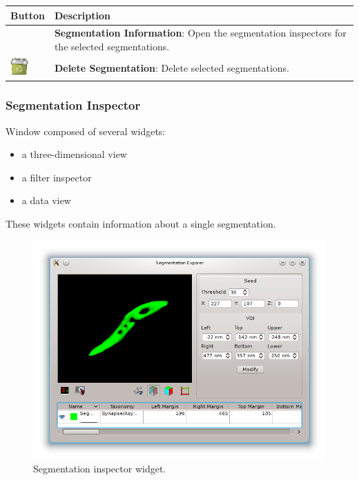 \begin{tabular}{| m{1.3cm} | m{13.5cm} |}
\hline
\textbf{Button} & \textbf{Description}\\
\hline
 & %
\textbf{Segmentation Information}: Open the segmentation inspectors for the
selected segmentations.\\
\hline
\includegraphics[width=0.7cm]{../../frontend/rsc/trash-full} &
\textbf{Delete Segmentation}: Delete selected segmentations.\\
\hline
\end{tabular}
\vspace{0.3cm}

\subsubsection{Segmentation Inspector}

Window composed of several widgets:
\begin{itemize}
\item a three-dimensional view
\item a filter inspector 
\item a data view
\end{itemize}
These widgets contain information about a single segmentation.

\begin{figure}[H]
\centering
\includegraphics[width=\linewidth]{fig/SegmentationInspector}
\caption{Segmentation inspector widget.}
\end{figure}

